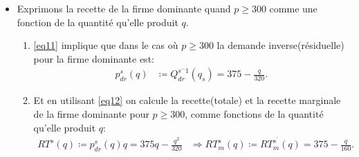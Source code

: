 \begin{frame}
\begin{itemize}
\begin{align}
\begin{array}{ll}
60000 - 120p & \text{sinon}.
\end{array}\right.
\label{eq11}
\end{align}
\item Exprimons la recette de la firme dominante quand $p\geq 300$ comme une fonction de la quantité qu'elle produit $q$.
\begin{enumerate}[$\cdot$]
   \item \eqref{eq11}  implique que dans le cas où $p\geq 300$ la demande inverse(résiduelle) pour la firme dominante est:
   \begin{align}
   p_{dr}^s(q) &\coloneqq Q_{dr}^{s^-1}(q_s) = 375 - \frac{q}{320}\label{eq12}.
   \end{align}
   \item Et en utilisant \eqref{eq12} on calcule la recette(totale) et  la recette marginale de la firme dominante pour $p\geq 300$, comme fonctions de la quantité qu'elle produit $q$:
   \begin{align}
   RT^s(q) \coloneqq  p_{dr}^s(q)q = 375q - \frac{q^2}{320}&\Rightarrow RT^s_m(q) \coloneqq RT_m^{s^\prime}(q) = 375-  \frac{q}{160}.
   \label{eq13}
   \end{align}
\end{enumerate}
   \end{itemize}
 \end{frame}
 
